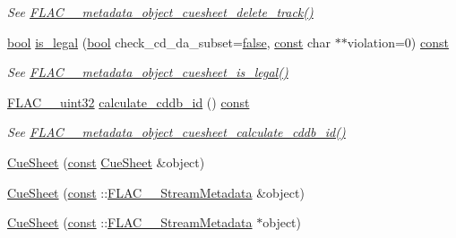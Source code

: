 \begin{DoxyCompactItemize}
\begin{DoxyCompactList}\small\item\em See \hyperlink{group__flac__metadata__object_ga3232bae96f19722bee19afd37fdc214d}{F\+L\+A\+C\+\_\+\+\_\+metadata\+\_\+object\+\_\+cuesheet\+\_\+delete\+\_\+track()} \end{DoxyCompactList}\item 
\hyperlink{mac_2config_2i386_2lib-src_2libsoxr_2soxr-config_8h_abb452686968e48b67397da5f97445f5b}{bool} \hyperlink{class_f_l_a_c_1_1_metadata_1_1_cue_sheet_a138691cddff703a729e3e295d82e7619}{is\+\_\+legal} (\hyperlink{mac_2config_2i386_2lib-src_2libsoxr_2soxr-config_8h_abb452686968e48b67397da5f97445f5b}{bool} check\+\_\+cd\+\_\+da\+\_\+subset=\hyperlink{mac_2config_2i386_2lib-src_2libsoxr_2soxr-config_8h_a65e9886d74aaee76545e83dd09011727}{false}, \hyperlink{getopt1_8c_a2c212835823e3c54a8ab6d95c652660e}{const} char $\ast$$\ast$violation=0) \hyperlink{getopt1_8c_a2c212835823e3c54a8ab6d95c652660e}{const} 
\begin{DoxyCompactList}\small\item\em See \hyperlink{group__flac__metadata__object_ga1160f85e437c1a763ec0a8f372cb1390}{F\+L\+A\+C\+\_\+\+\_\+metadata\+\_\+object\+\_\+cuesheet\+\_\+is\+\_\+legal()} \end{DoxyCompactList}\item 
\hyperlink{ordinals_8h_a9c4005ea7ef8d564b0cc993cdd0e4e5e}{F\+L\+A\+C\+\_\+\+\_\+uint32} \hyperlink{class_f_l_a_c_1_1_metadata_1_1_cue_sheet_a074694c791cbbaaf59f5baadb8e54e08}{calculate\+\_\+cddb\+\_\+id} () \hyperlink{getopt1_8c_a2c212835823e3c54a8ab6d95c652660e}{const} 
\begin{DoxyCompactList}\small\item\em See \hyperlink{group__flac__metadata__object_ga897138ca0a985d8741f73d6657f38845}{F\+L\+A\+C\+\_\+\+\_\+metadata\+\_\+object\+\_\+cuesheet\+\_\+calculate\+\_\+cddb\+\_\+id()} \end{DoxyCompactList}\end{DoxyCompactItemize}
{\bf }\par
\begin{DoxyCompactItemize}
\item 
\hyperlink{class_f_l_a_c_1_1_metadata_1_1_cue_sheet_aff87fa8ab761fc12c0f37b6ff033f74e}{Cue\+Sheet} (\hyperlink{getopt1_8c_a2c212835823e3c54a8ab6d95c652660e}{const} \hyperlink{class_f_l_a_c_1_1_metadata_1_1_cue_sheet}{Cue\+Sheet} \&object)
\item 
\hyperlink{class_f_l_a_c_1_1_metadata_1_1_cue_sheet_a70f56da621341cd05a14bafe3ddded70}{Cue\+Sheet} (\hyperlink{getopt1_8c_a2c212835823e3c54a8ab6d95c652660e}{const} \+::\hyperlink{struct_f_l_a_c_____stream_metadata}{F\+L\+A\+C\+\_\+\+\_\+\+Stream\+Metadata} \&object)
\item 
\hyperlink{class_f_l_a_c_1_1_metadata_1_1_cue_sheet_a0248e035cd9c13338355074d68032e90}{Cue\+Sheet} (\hyperlink{getopt1_8c_a2c212835823e3c54a8ab6d95c652660e}{const} \+::\hyperlink{struct_f_l_a_c_____stream_metadata}{F\+L\+A\+C\+\_\+\+\_\+\+Stream\+Metadata} $\ast$object)
\end{DoxyCompactItemize}

